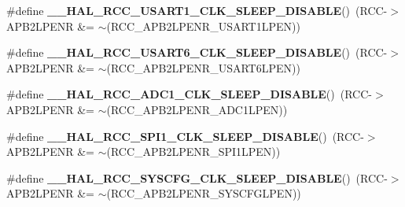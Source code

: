 \begin{DoxyCompactItemize}
\item 
\#define {\bfseries \+\_\+\+\_\+\+H\+A\+L\+\_\+\+R\+C\+C\+\_\+\+U\+S\+A\+R\+T1\+\_\+\+C\+L\+K\+\_\+\+S\+L\+E\+E\+P\+\_\+\+D\+I\+S\+A\+B\+LE}()~(R\+CC-\/$>$A\+P\+B2\+L\+P\+E\+NR \&= $\sim$(R\+C\+C\+\_\+\+A\+P\+B2\+L\+P\+E\+N\+R\+\_\+\+U\+S\+A\+R\+T1\+L\+P\+EN))\hypertarget{group___r_c_c___a_p_b2___low_power___enable___disable_ga75ec6abe2e15eaa24893a8cc83f4cb50}{}\label{group___r_c_c___a_p_b2___low_power___enable___disable_ga75ec6abe2e15eaa24893a8cc83f4cb50}

\item 
\#define {\bfseries \+\_\+\+\_\+\+H\+A\+L\+\_\+\+R\+C\+C\+\_\+\+U\+S\+A\+R\+T6\+\_\+\+C\+L\+K\+\_\+\+S\+L\+E\+E\+P\+\_\+\+D\+I\+S\+A\+B\+LE}()~(R\+CC-\/$>$A\+P\+B2\+L\+P\+E\+NR \&= $\sim$(R\+C\+C\+\_\+\+A\+P\+B2\+L\+P\+E\+N\+R\+\_\+\+U\+S\+A\+R\+T6\+L\+P\+EN))\hypertarget{group___r_c_c___a_p_b2___low_power___enable___disable_ga7df7a1b0a2e5d8b9318cf68de7665b3b}{}\label{group___r_c_c___a_p_b2___low_power___enable___disable_ga7df7a1b0a2e5d8b9318cf68de7665b3b}

\item 
\#define {\bfseries \+\_\+\+\_\+\+H\+A\+L\+\_\+\+R\+C\+C\+\_\+\+A\+D\+C1\+\_\+\+C\+L\+K\+\_\+\+S\+L\+E\+E\+P\+\_\+\+D\+I\+S\+A\+B\+LE}()~(R\+CC-\/$>$A\+P\+B2\+L\+P\+E\+NR \&= $\sim$(R\+C\+C\+\_\+\+A\+P\+B2\+L\+P\+E\+N\+R\+\_\+\+A\+D\+C1\+L\+P\+EN))\hypertarget{group___r_c_c___a_p_b2___low_power___enable___disable_ga9534ddc24145ef6335d76b35632b7fe2}{}\label{group___r_c_c___a_p_b2___low_power___enable___disable_ga9534ddc24145ef6335d76b35632b7fe2}

\item 
\#define {\bfseries \+\_\+\+\_\+\+H\+A\+L\+\_\+\+R\+C\+C\+\_\+\+S\+P\+I1\+\_\+\+C\+L\+K\+\_\+\+S\+L\+E\+E\+P\+\_\+\+D\+I\+S\+A\+B\+LE}()~(R\+CC-\/$>$A\+P\+B2\+L\+P\+E\+NR \&= $\sim$(R\+C\+C\+\_\+\+A\+P\+B2\+L\+P\+E\+N\+R\+\_\+\+S\+P\+I1\+L\+P\+EN))\hypertarget{group___r_c_c___a_p_b2___low_power___enable___disable_ga2abe90eeb15890f45e28e8926bf70838}{}\label{group___r_c_c___a_p_b2___low_power___enable___disable_ga2abe90eeb15890f45e28e8926bf70838}

\item 
\#define {\bfseries \+\_\+\+\_\+\+H\+A\+L\+\_\+\+R\+C\+C\+\_\+\+S\+Y\+S\+C\+F\+G\+\_\+\+C\+L\+K\+\_\+\+S\+L\+E\+E\+P\+\_\+\+D\+I\+S\+A\+B\+LE}()~(R\+CC-\/$>$A\+P\+B2\+L\+P\+E\+NR \&= $\sim$(R\+C\+C\+\_\+\+A\+P\+B2\+L\+P\+E\+N\+R\+\_\+\+S\+Y\+S\+C\+F\+G\+L\+P\+EN))\hypertarget{group___r_c_c___a_p_b2___low_power___enable___disable_ga04863ff5c2174552387c549f0410df43}{}\label{group___r_c_c___a_p_b2___low_power___enable___disable_ga04863ff5c2174552387c549f0410df43}


\end{DoxyCompactItemize}
